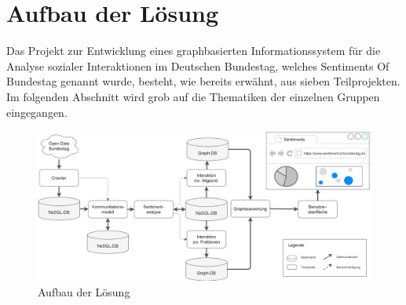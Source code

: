 \section{Aufbau der Lösung}\label{sec:01_02_aufbauLoesung}
Das Projekt zur Entwicklung eines graphbasierten Informationssystem für die Analyse sozialer Interaktionen im Deutschen Bundestag, welches \glqq Sentiments Of Bundestag\grqq{} genannt wurde, besteht, wie bereits erwähnt, aus sieben Teilprojekten. Im folgenden Abschnitt wird grob auf die Thematiken der einzelnen Gruppen eingegangen.

\begin{figure}[H]
    \centering
    \includegraphics[width=\textwidth]{images/01-Einleitung/SentimentOfBundestag.png}
    \caption{Aufbau der Lösung}
    \label{fig:aufbauderLösungSOB}
\end{figure}

